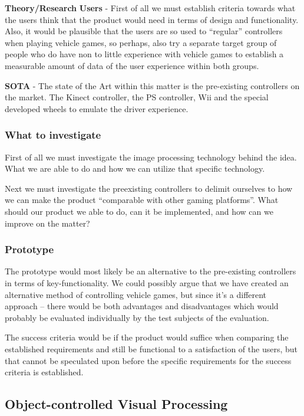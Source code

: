 \noindent\textbf{Theory/Research}\newline
\noindent\textbf{Users} - First of all we must establish criteria towards what the users think that the product would need in terms of design and functionality. Also, it would be plausible that the users are so used to “regular” controllers when playing vehicle games, so perhaps, also try a separate target group of people who do have non to little experience with vehicle games to establish a measurable amount of data of the user experience within both groups.
\bigskip

\noindent\textbf{SOTA} - The state of the Art within this matter is the pre-existing controllers on the market. The Kinect controller, the PS controller, Wii and the special developed wheels to emulate the driver experience.

\subsubsection*{What to investigate}
First of all we must investigate the image processing technology behind the idea. What we are able to do and how we can utilize that specific technology.
\bigskip

Next we must investigate the preexisting controllers to delimit ourselves to how we can make the product “comparable with other gaming platforms”. What should our product we able to do, can it be implemented, and how can we improve on the matter?

\subsubsection*{Prototype}
The prototype would most likely be an alternative to the pre-existing controllers in terms of key-functionality. We could possibly argue that we have created an alternative method of controlling vehicle games, but since it’s a different approach – there would be both advantages and disadvantages which would probably be evaluated individually by the test subjects of the evaluation.
\bigskip

The success criteria would be if the product would suffice when comparing the established requirements and still be functional to a satisfaction of the users, but that cannot be speculated upon before the specific requirements for the success criteria is established.

\pagebreak

\subsection{Object-controlled Visual Processing} \label{nd5}
